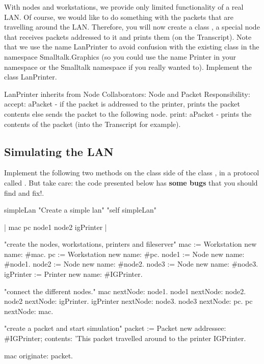\exercise With nodes and workstations, we provide only limited
functionality of a real LAN. Of course, we would like to do
something with the packets that are travelling around the LAN.
Therefore, you will now create a class , a special
node that receives packets addressed to it and prints them (on the
Transcript). Note that we use the name LanPrinter to avoid confusion with the existing class
 in the namespace Smalltalk.Graphics (so you could use the name Printer in your namespace or the Smalltalk namespace if you really wanted to). Implement the class LanPrinter.

\begin{scode}
LanPrinter inherits from Node
Collaborators: Node and Packet
Responsibility:
accept: aPacket - if the packet is addressed to the
printer, prints the packet contents else sends the packet
to the following node.
print: aPacket - prints the contents of the packet
(into the Transcript for example).
\end{scode}


\subsection*{Simulating the LAN}

Implement the following two methods on the class side of the class
, in a protocol called . But take
care: the code presented below has \textbf{some bugs} that you should
find and fix!.

\begin{scode}
simpleLan
  "Create a simple lan"
  "self simpleLan"

  | mac pc node1 node2 igPrinter |

  "create the nodes, workstations, printers and fileserver"
  mac := Workstation new name: \#mac.
  pc := Workstation new name: \#pc.
  node1 := Node new name: \#node1.
  node2 := Node new name: \#node2.
  node3 := Node new name: \#node3.
  igPrinter := Printer new name: \#IGPrinter.

  "connect the different nodes."
  mac nextNode: node1.
  node1 nextNode: node2.
  node2 nextNode: igPrinter.
  igPrinter nextNode: node3.
  node3 nextNode: pc.
  pc nextNode: mac.

  "create a packet and start simulation"
  packet := Packet new
            addressee: \#IGPrinter;
            contents: 'This packet travelled around
to the printer IGPrinter.

  mac originate: packet.
\end{scode}

